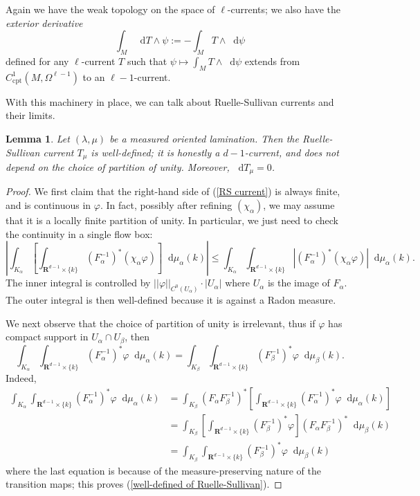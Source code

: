 \documentclass[reqno,11pt]{amsart}
\newcommand{\RR}{\mathbf{R}}
\newcommand*\dif{\mathop{}\!\mathrm{d}}
\newcommand{\dfn}[1]{\emph{#1}\index{#1}}
\newcommand{\cpt}{\mathrm{cpt}}
\newtheorem{lemma}[theorem]{Lemma}
\theoremstyle{definition}
\numberwithin{equation}{section}
\begin{document}
Again we have the weak topology on the space of $\ell$-currents; we also have the \dfn{exterior derivative}
$$\int_M \dif T \wedge \psi := -\int_M T \wedge \dif \psi$$
defined for any $\ell$-current $T$ such that $\psi \mapsto \int_M T \wedge \dif \psi$ extends from $C^1_\cpt(M, \Omega^{\ell - 1})$ to an $\ell - 1$-current.

With this machinery in place, we can talk about Ruelle-Sullivan currents and their limits.

\begin{lemma}
Let $(\lambda, \mu)$ be a measured oriented lamination.
Then the Ruelle-Sullivan current $T_\mu$ is well-defined; it is honestly a $d-1$-current, and does not depend on the choice of partition of unity.
Moreover, $\dif T_\mu = 0$.
\end{lemma}
\begin{proof}
We first claim that the right-hand side of (\ref{RS current}) is always finite, and is continuous in $\varphi$.
In fact, possibly after refining $(\chi_\alpha)$, we may assume that it is a locally finite partition of unity.
In particular, we just need to check the continuity in a single flow box:
$$\left|\int_{K_\alpha} \left[\int_{\RR^{d - 1} \times \{k\}} (F_\alpha^{-1})^* (\chi_\alpha \varphi) \right] \dif \mu_\alpha(k)\right| \leq \int_{K_\alpha} \int_{\RR^{d - 1} \times \{k\}} |(F_\alpha^{-1})^* (\chi_\alpha \varphi)| \dif \mu_\alpha(k).$$
The inner integral is controlled by $||\varphi||_{C^0(U_\alpha)} \cdot |U_\alpha|$ where $U_\alpha$ is the image of $F_\alpha$.
The outer integral is then well-defined because it is against a Radon measure.

We next observe that the choice of partition of unity is irrelevant, thus if $\varphi$ has compact support in $U_\alpha \cap U_\beta$, then
\begin{equation}\label{well-defined of Ruelle-Sullivan}
\int_{K_\alpha} \int_{\RR^{d - 1} \times \{k\}} (F_\alpha^{-1})^* \varphi \dif \mu_\alpha(k) = \int_{K_\beta} \int_{\RR^{d - 1} \times \{k\}} (F_\beta^{-1})^* \varphi \dif \mu_\beta(k).
\end{equation}
Indeed,
\begin{align*}
\int_{K_\alpha} \int_{\RR^{d - 1} \times \{k\}} (F_\alpha^{-1})^* \varphi \dif \mu_\alpha(k)
&= \int_{K_\beta} (F_\alpha F_\beta^{-1})^* \left[\int_{\RR^{d - 1} \times \{k\}} (F_\alpha^{-1})^* \varphi \dif \mu_\alpha(k)\right] \\
&= \int_{K_\beta} \left[\int_{\RR^{d - 1} \times \{k\}} (F_\beta^{-1})^* \varphi\right] (F_\alpha F_\beta^{-1})^* \dif \mu_\beta(k) \\
&= \int_{K_\beta} \int_{\RR^{d - 1} \times \{k\}} (F_\beta^{-1})^* \varphi \dif \mu_\beta(k)
\end{align*}
where the last equation is because of the measure-preserving nature of the transition maps; this proves (\ref{well-defined of Ruelle-Sullivan}).


\end{proof}
\end{document}
